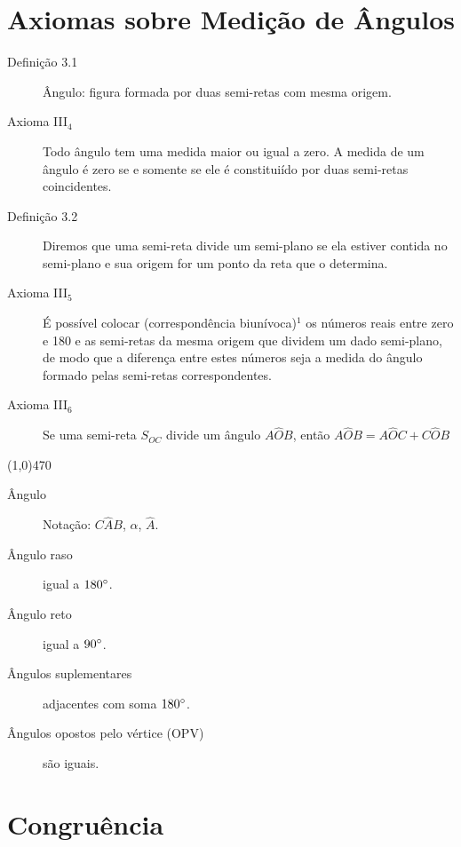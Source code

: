 \documentclass[11pt]{article}
\begin{document}
\section{Axiomas sobre Medição de Ângulos}

\begin{description}
  \item[Definição 3.1] Ângulo: figura formada por duas semi-retas com mesma
    origem.

  \item[Axioma III$_{4}$] Todo ângulo tem uma medida maior ou igual a zero. A
    medida de um ângulo é zero se e somente se ele é constituiído por duas
    semi-retas coincidentes.

  \item[Definição 3.2] Diremos que uma semi-reta divide um semi-plano se ela
    estiver contida no semi-plano e sua origem for um ponto da reta que o
    determina.

  \item[Axioma III$_{5}$] É possível colocar (correspondência biunívoca)$^1$
    os números reais entre zero e 180 e as semi-retas da mesma origem que
    dividem um dado semi-plano, de modo que a diferença entre estes números
    seja a medida do ângulo formado pelas semi-retas correspondentes.

  \item[Axioma III$_6$] Se uma semi-reta $S_{OC}$ divide um ângulo $A\hat{O}B$,
    então $A\hat{O}B = A\hat{O}C + C\hat{O}B$
\end{description}

\line(1,0){470}

\begin{description}
  \item[Ângulo] Notação: $C\hat{A}B$, $\alpha$, $\hat{A}$.
  \item[Ângulo raso] igual a $180\degree$.
  \item[Ângulo reto] igual a $90\degree$.
  \item[Ângulos suplementares] adjacentes com soma $180\degree$.
  \item[Ângulos opostos pelo vértice (OPV)] são iguais.
\end{description}

\section{Congruência}
\end{document}
